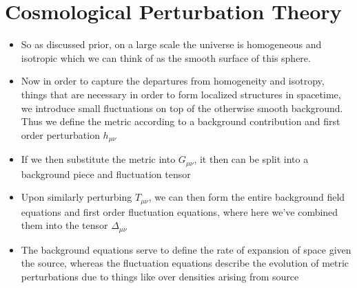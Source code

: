 \documentclass[10pt,letterpaper]{article}
\numberwithin{equation}{section}
\begin{document}
\section{Cosmological Perturbation Theory}
\begin{itemize}
	\item So as discussed prior, on a large scale the universe is homogeneous and isotropic which we can think of as the smooth surface of this sphere.
	\item Now in order to capture the departures from homogeneity and isotropy, things that are necessary in order to form localized structures in spacetime, we introduce small fluctuations on top of the otherwise smooth background. Thus we define the metric according to a background contribution and first order perturbation $h_{\mu\nu}$ 
	\item If we then substitute the metric into $G_{\mu\nu}$, it then can be split into a background piece and fluctuation tensor
	\item Upon similarly perturbing $T_{\mu\nu}$, we can then form the entire background field equations and first order fluctuation equations, where here we've combined them into the tensor $\Delta_{\mu\nu}$
	\item The background equations serve to define the rate of expansion of space given the source, whereas the fluctuation equations describe the evolution of metric perturbations due to things like over densities arising from source
\end{itemize}

\end{document}
